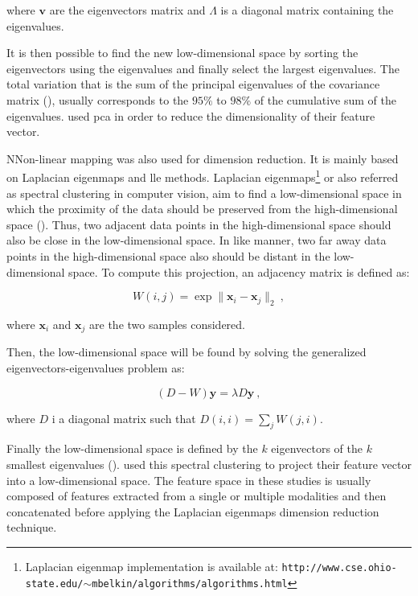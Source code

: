 \noindent where $\mathbf{v}$ are the eigenvectors matrix and $\Lambda$ is a diagonal matrix containing the eigenvalues. 

It is then possible to find the new low-dimensional space by sorting the eigenvectors using the eigenvalues and finally select the largest eigenvalues. The total variation that is the sum of the principal eigenvalues of the covariance matrix (\cite{Fodor2002}), usually corresponds to the $95\%$ to $98\%$ of the cumulative sum of the eigenvalues. \cite{Tiwari2008,Tiwari2009,Tiwari2012} used \ac{pca} in order to reduce the dimensionality of their feature vector.

NNon-linear mapping was also used for dimension reduction. It is mainly based on Laplacian eigenmaps and \acf{lle} methods. Laplacian eigenmaps\footnote{Laplacian eigenmap implementation is available at: \texttt{http://www.cse.ohio-state.edu/\allowbreak $\sim$mbelkin/algorithms/algorithms.html}} or also referred as spectral clustering in computer vision, aim to find a low-dimensional space in which the proximity of the data should be preserved from the high-dimensional space (\cite{Shi2000,Belkin2001}). Thus, two adjacent data points in the high-dimensional space should also be close in the low-dimensional space. In like manner, two far away data points in the high-dimensional space also should be distant in the low-dimensional space. To compute this projection, an adjacency matrix is defined as:

\begin{equation}
	W(i,j) = \exp \| \mathbf{x}_i - \mathbf{x}_j \|_2 \ ,
	\label{eq:gew}
\end{equation}

\noindent where $\mathbf{x}_i$ and $\mathbf{x}_j$ are the two samples considered.

Then, the low-dimensional space will be found by solving the generalized eigenvectors-eigenvalues problem as:

\begin{equation}
	(D-W)\mathbf{y} = \lambda D \mathbf{y} \ ,
	\label{eq:geeig}
\end{equation}

\noindent where $D$ i a diagonal matrix such that $D(i,i) = \sum_j W(j,i)$.

Finally the low-dimensional space is defined by the $k$ eigenvectors of the $k$ smallest eigenvalues (\cite{Belkin2001}). \cite{Tiwari2007,Tiwari2009,Tiwari2009a,Viswanath2008} used this spectral clustering to project their feature vector into a low-dimensional space. The feature space in these studies is usually composed of features extracted from a single or multiple modalities and then concatenated before applying the Laplacian eigenmaps dimension reduction technique.

